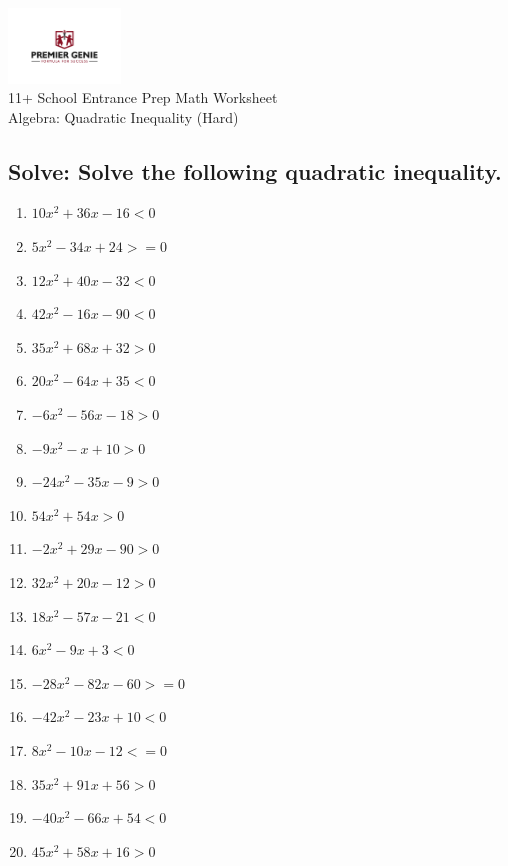 \documentclass{article}
\begin{document}
\begin{center}
\includegraphics[width=3cm]{PREMGENIEJPG.jpg}\\
{\Large 11+ School Entrance Prep Math Worksheet}\\
{\Medium Algebra: Quadratic Inequality (Hard)}\\

\end{center}

\subsection*{Solve: Solve the following quadratic inequality.}

\begin{enumerate}
\item $\displaystyle 10 x^{2} + 36 x - 16<0 $ \ 
\item $\displaystyle 5 x^{2} - 34 x + 24>=0 $ \ 
\item $\displaystyle 12 x^{2} + 40 x - 32<0 $ \ 
\item $\displaystyle 42 x^{2} - 16 x - 90<0 $ \ 
\item $\displaystyle 35 x^{2} + 68 x + 32>0 $ \ 
\item $\displaystyle 20 x^{2} - 64 x + 35<0 $ \ 
\item $\displaystyle - 6 x^{2} - 56 x - 18>0 $ \ 
\item $\displaystyle - 9 x^{2} - x + 10>0 $ \ 
\item $\displaystyle - 24 x^{2} - 35 x - 9>0 $ \ 
\item $\displaystyle 54 x^{2} + 54 x>0 $ \ 
\item $\displaystyle - 2 x^{2} + 29 x - 90>0 $ \ 
\item $\displaystyle 32 x^{2} + 20 x - 12>0 $ \ 
\item $\displaystyle 18 x^{2} - 57 x - 21<0 $ \ 
\item $\displaystyle 6 x^{2} - 9 x + 3<0 $ \ 
\item $\displaystyle - 28 x^{2} - 82 x - 60>=0 $ \ 
\item $\displaystyle - 42 x^{2} - 23 x + 10<0 $ \ 
\item $\displaystyle 8 x^{2} - 10 x - 12<=0 $ \ 
\item $\displaystyle 35 x^{2} + 91 x + 56>0 $ \ 
\item $\displaystyle - 40 x^{2} - 66 x + 54<0 $ \ 
\item $\displaystyle 45 x^{2} + 58 x + 16>0 $ \ 


\end{enumerate}
\end{document}
